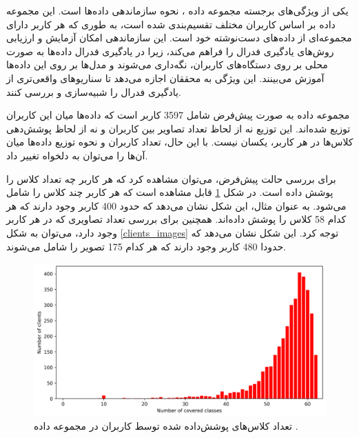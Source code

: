 یکی از ویژگی‌های برجسته مجموعه داده
،
نحوه سازماندهی داده‌ها است. این مجموعه داده بر اساس کاربران مختلف تقسیم‌بندی شده است، به طوری که هر کاربر دارای مجموعه‌ای از داده‌های دست‌نوشته خود است. این سازماندهی امکان آزمایش و ارزیابی روش‌های یادگیری فدرال را فراهم می‌کند، زیرا در یادگیری فدرال داده‌ها به صورت محلی بر روی دستگاه‌های کاربران، نگه‌داری می‌شوند و مدل‌ها بر روی این داده‌ها آموزش می‌بینند. این ویژگی به محققان اجازه می‌دهد تا سناریوهای واقعی‌تری از یادگیری فدرال را شبیه‌سازی و بررسی کنند.

مجموعه داده
به صورت پیش‌فرض شامل 3597 کاربر است که داده‌ها میان این کاربران توزیع شده‌اند. این توزیع نه از لحاظ تعداد تصاویر بین کاربران و نه از لحاظ پوشش‌دهی کلاس‌ها در هر کاربر، یکسان نیست. با این حال، تعداد کاربران و نحوه توزیع داده‌ها میان آن‌ها را می‌توان به دلخواه تغییر داد.

برای بررسی حالت پیش‌فرض، می‌توان مشاهده کرد که هر کاربر چه تعداد کلاس را پوشش داده است. در شکل
\ref{clients_cover_classes}
قابل مشاهده است که هر کاربر چند کلاس را شامل می‌شود. به عنوان مثال، این شکل نشان می‌دهد که حدود 400 کاربر وجود دارند که هر کدام 58 کلاس را پوشش داده‌اند. همچنین برای بررسی تعداد تصاویری که در هر کاربر وجود دارد، می‌توان به شکل
\ref{clients_images}
توجه کرد. این شکل نشان می‌دهد که حدودا 480 کاربر وجود دارند که هر کدام 175 تصویر را شامل می‌شوند.



\begin{figure}[t]
	\centering
	\includegraphics[scale=0.7]{images/chap5/clients_cover_classes.png}%
	\caption{%
تعداد کلاس‌های پوشش‌داده شده توسط کاربران در مجموعه داده
		.
	}
	\label{clients_cover_classes}
	\centering
\end{figure}


